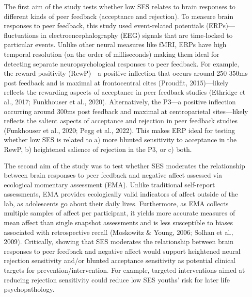 \documentclass[
  man]{apa7}
\begin{document}
The first aim of the study tests whether low SES relates to brain responses to different kinds of peer feedback (acceptance and rejection). To measure brain responses to peer feedback, this study used event-related potentials (ERPs)---fluctuations in electroencephalography (EEG) signals that are time-locked to particular events. Unlike other neural measures like fMRI, ERPs have high temporal resolution (on the order of milliseconds) making them ideal for detecting separate neuropsychological responses to peer feedback. For example, the reward positivity (RewP)---a positive inflection that occurs around 250-350ms post feedback and is maximal at frontocentral cites (Proudfit, 2015)---likely reflects the rewarding aspects of acceptance in peer feedback studies (Ethridge et al., 2017; Funkhouser et al., 2020). Alternatively, the P3---a positive inflection occurring around 300ms post feedback and maximal at centroparietal sites---likely reflects the salient aspects of acceptance and rejection in peer feedback studies (Funkhouser et al., 2020; Pegg et al., 2022). This makes ERP ideal for testing whether low SES is related to a) more blunted sensitivity to acceptance in the RewP, b) heightened salience of rejection in the P3, or c) both.

The second aim of the study was to test whether SES moderates the relationship between brain responses to peer feedback and negative affect assessed via ecological momentary assessment (EMA). Unlike traditional self-report assessments, EMA provides ecologically valid indicators of affect outside of the lab, as adolescents go about their daily lives. Furthermore, as EMA collects multiple samples of affect per participant, it yields more accurate measures of mean affect than single snapshot assessments and is less susceptible to biases associated with retrospective recall (Moskowitz \& Young, 2006; Solhan et al., 2009). Critically, showing that SES moderates the relationship between brain responses to peer feedback and negative affect would support heightened neural rejection sensitivity and/or blunted acceptance sensitivity as potential clinical targets for prevention/intervention. For example, targeted interventions aimed at reducing rejection sensitivity could reduce low SES youths' risk for later life psychopathology.
\end{document}
